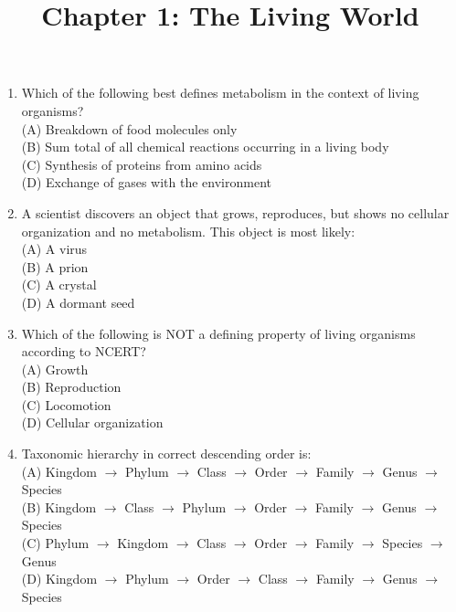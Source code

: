 \documentclass{article}
\begin{document}
\title{Chapter 1: The Living World}
\date{}
\maketitle

\begin{enumerate}[label=Q\arabic*.]

\item Which of the following best defines metabolism in the context of living organisms?
\\(A) Breakdown of food molecules only
\\(B) Sum total of all chemical reactions occurring in a living body
\\(C) Synthesis of proteins from amino acids
\\(D) Exchange of gases with the environment

\item A scientist discovers an object that grows, reproduces, but shows no cellular organization and no metabolism. This object is most likely:
\\(A) A virus
\\(B) A prion
\\(C) A crystal
\\(D) A dormant seed

\item Which of the following is NOT a defining property of living organisms according to NCERT?
\\(A) Growth
\\(B) Reproduction
\\(C) Locomotion
\\(D) Cellular organization

\item Taxonomic hierarchy in correct descending order is:
\\(A) Kingdom $\rightarrow$ Phylum $\rightarrow$ Class $\rightarrow$ Order $\rightarrow$ Family $\rightarrow$ Genus $\rightarrow$ Species
\\(B) Kingdom $\rightarrow$ Class $\rightarrow$ Phylum $\rightarrow$ Order $\rightarrow$ Family $\rightarrow$ Genus $\rightarrow$ Species
\\(C) Phylum $\rightarrow$ Kingdom $\rightarrow$ Class $\rightarrow$ Order $\rightarrow$ Family $\rightarrow$ Species $\rightarrow$ Genus
\\(D) Kingdom $\rightarrow$ Phylum $\rightarrow$ Order $\rightarrow$ Class $\rightarrow$ Family $\rightarrow$ Genus $\rightarrow$ Species


\end{enumerate}
\end{document}
